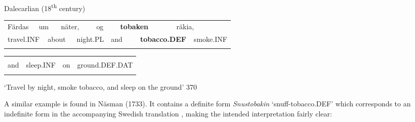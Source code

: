 \begin{listWWNumileveli}
\item 

\begin{styleExample}
Dalecarlian (18\textsuperscript{th} century)

\end{styleExample}

\end{listWWNumileveli}

\begin{tabular}{llllllllllll}
\lsptoprule
Färdas & \multicolumn{2}{l}{um

} & \multicolumn{2}{l}{näter,

} & \multicolumn{2}{l}{og

} & \multicolumn{2}{l}{{\bfseries tobaken}

} & \multicolumn{2}{l}{räkia,

} & \\
\multicolumn{2}{l}{travel.INF

} & \multicolumn{2}{l}{about

} & \multicolumn{2}{l}{night.PL

} & \multicolumn{2}{l}{and

} & \multicolumn{2}{l}{{\bfseries tobacco.DEF}

} & \multicolumn{2}{l}{smoke.INF

}\\
\lspbottomrule
\end{tabular}

\begin{tabular}{llll}
\lsptoprule
\multicolumn{4}{l}{og

}\\
and & sleep.INF & on & ground.DEF.DAT\\
\lspbottomrule
\end{tabular}

\begin{styleTranslation}
‘Travel by night, smoke tobacco, and sleep on the ground’ 370 

\end{styleTranslation}

\begin{styleBodyTextFirst}
A similar example is found in Näsman (1733). It contains a definite form \textit{Snustobakin} ‘snuff-tobacco.DEF’ which corresponds to an indefinite form in the accompanying Swedish translation , making the intended interpretation fairly clear:

\end{styleBodyTextFirst}

